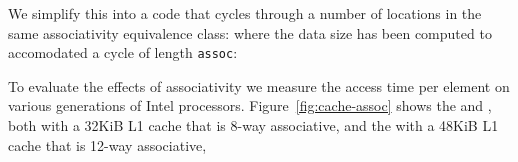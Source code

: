 We simplify this into a code that cycles through a number of locations
in the same associativity equivalence class:
where the data size has been computed to accomodated
a cycle of length \lstinline{assoc}:

To evaluate the effects of associativity we measure the access time per element
on various generations of Intel processors.
Figure~\ref{fig:cache-assoc} shows the
 and ,
both with a 32KiB L1 cache that is 8-way associative,
and the  
with a 48KiB L1 cache that is 12-way associative,


\begin{comment}
  As an example we take the
  \indextermbus{AMD}{Opteron}, which has an L1 cache of 64K bytes, and
  which is two-way set associative. Because of the set associativity,
  the cache can handle two addresses being mapped to the same cache
  location, but not three or more. Thus, we let the vectors be of
  size~$n=4096$ doubles, and we measure the effect in cache misses and
  cycles of letting $m=1,2,\ldots$.

  \begin{figure}[ht]
    \begin{quote}
      \texttt{[image: l1\_assoc]}
    \end{quote}
    \caption{The number of L1 cache misses and the number of cycles for
      each $j$ column accumulation, vector length~$4096$.}
    \label{fig:l1_assoc}
  \end{figure}

  \begin{figure}[ht]
    \begin{quote}
      \texttt{[image: l1\_assocshift]}
    \end{quote}
    \caption{The number of L1 cache misses and the number of cycles for
      each $j$ column accumulation, vector length~$4096+8$.}
    \label{fig:l1_assoc_shift}
  \end{figure}

  First of all, we note that we use the vectors sequentially, so, with a
  cacheline of eight doubles, we should ideally see a cache miss rate of
  $1/8$ times the number of vectors~$m$. Instead, in
  figure~\ref{fig:l1_assoc} we see a rate approximately proportional
  to~$m$, meaning that indeed cache lines are evicted immediately. The
  exception here is the case $m=1$, where the two-way associativity
  allows the cachelines of two vectors to stay in cache.


\end{comment}
